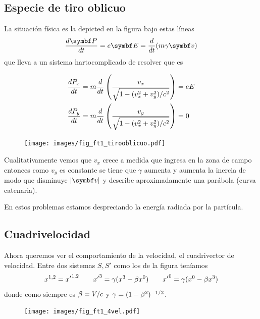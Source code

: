 \documentclass[10pt,oneside]{CBFT_book}
\begin{document}
\subsection{Especie de tiro oblicuo}

La situación física es la depicted en la figura bajo estas líneas
\[
	\dtot{\vb{P}}{t} = e\vb{E} = \dtot{}{t}( m \gamma \vb{v} )
\]
que lleva a un sistema hartocomplicado de resolver que es 

\begin{align*}
 \frac{d^{\hspace{-0.05em}} {P_x}}{d {t}^{\hspace{-0.05em}}} &= m \frac{d^{\hspace{-0.05em}} {}}{d {t}^{\hspace{-0.05em}}}\left( \frac{v_x}{ \sqrt{ 1 - (v_x^2 + v_y^2)/c^2 } }\right) = eE \\
 \frac{d^{\hspace{-0.05em}} {P_y}}{d {t}^{\hspace{-0.05em}}} &= m \frac{d^{\hspace{-0.05em}} {}}{d {t}^{\hspace{-0.05em}}}\left( \frac{v_y}{ \sqrt{ 1 - (v_x^2 + v_y^2)/c^2 } }\right) =0 \\
\end{align*}


\begin{figure}[htb]
	\begin{center}
	\texttt{[image: images/fig\_ft1\_tirooblicuo.pdf]}	 
	\end{center}
	\caption{}
\end{figure} 

Cualitativamente vemos que $v_x$ crece a medida que ingresa en la zona de campo  entonces como $v_y$ es
constante se tiene que $\gamma$ aumenta y aumenta la inercia de modo que disminuye $|\vb{v}|$ y describe
aproximadamente una parábola (curva catenaria).

En estos problemas estamos despreciando la energía radiada por la partícula.

\subsection{Cuadrivelocidad}

Ahora queremos ver el comportamiento de la velocidad, el cuadrivector de velocidad.
Entre dos sistemas $S, S'$ como los de la figura teníamos
\[
	x^{1,2} = {x'}^{1,2} \qquad {x'}^3 = \gamma (x^3 - \beta x^0 ) \qquad 
	{x'}^0 = \gamma (x^0 - \beta x^3 )
\]
donde como siempre es $\beta = V/c$ y $\gamma = ( 1 - \beta^2 )^{-1/2}$. 

\begin{figure}[htb]
	\begin{center}
	\texttt{[image: images/fig\_ft1\_4vel.pdf]}	 
	\end{center}
	\caption{}
\end{figure} 
\end{document}
